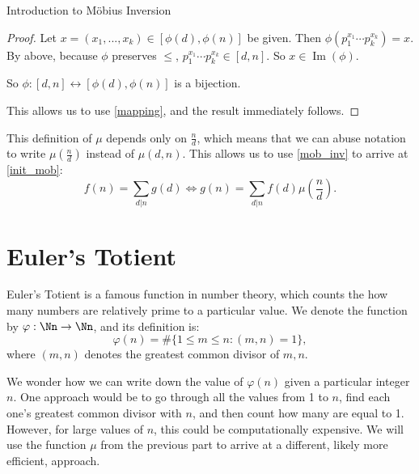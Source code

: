 \documentclass[12pt]{pom_thesis}
\DeclareMathOperator{\im}{Im}
\begin{document}
\begin{chapter}{Introduction to M\"obius Inversion}
\begin{proof}
Let $x = (x_1,...,x_k) \in [\phi(d), \phi(n)]$ be given. Then $\phi(p_1^{x_1}\cdots p_k^{x_k}) = x$. By above, because $\phi$ preserves $\leq$, $p_1^{x_1}\cdots p_k^{x_k} \in [d,n]$. So $x \in \im(\phi)$. 

So $\phi:[d,n] \leftrightarrow [\phi(d), \phi(n)]$ is a bijection.

This allows us to use \ref{mapping}, and the result immediately follows.
\end{proof}

This definition of $\mu$ depends only on $\frac nd$, which means that we can abuse notation to write $\mu(\frac nd)$ instead of $\mu(d,n)$. This allows us to use \ref{mob_inv} to arrive at \eqref{init_mob}:
\[
f(n) = \sum_{d | n} g(d) \iff g(n) = \sum_{d | n}  f(d)\mu\left(\frac nd\right).
\]
\section{Euler's Totient} %
Euler's Totient is a famous function in number theory, which counts the how many numbers are relatively prime to a particular value. We denote the function by $\varphi : \Nn \rightarrow \Nn$, and its definition is:
\[
\varphi(n) = \#\{1 \leq m \leq n : (m,n) = 1\},
\]
where $(m,n)$ denotes the greatest common divisor of $m,n$.

We wonder how we can write down the value of $\varphi(n)$ given a particular integer $n$. One approach would be to go through all the values from 1 to $n$, find each one's greatest common divisor with $n$, and then count how many are equal to 1. However, for large values of $n$, this could be computationally expensive. We will use the function $\mu$ from the previous part to arrive at a different, likely more efficient, approach.


\end{chapter}
\end{document}
